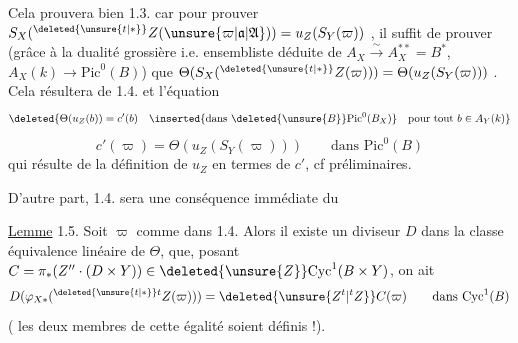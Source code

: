 Cela prouvera bien 1.3. car pour prouver $S_X({}^{\deleted{\unsure{t|*}}}Z(\unsure{\varpi|\mathfrak{a}|\mathfrak{A}}))=u_Z(S_Y(\varpi))$ , il suffit de prouver (grâce à la dualité grossière i.e. ensembliste  déduite de $A_X\xrightarrow{\sim}A_X^{**}=B^*$,  $A_X(k)\longrightarrow\mathrm{Pic}^0(B)$) que $\Theta(S_X({}^{\deleted{\unsure{t|*}}}Z(\varpi)))=\Theta(u_Z(S_Y(\varpi)))$ .  Cela résultera de 1.4. et  l'équation
\[
\deleted{\Theta(u_Z(b))=c'(b)\quad\inserted{\text{dans }\deleted{\unsure{B}}\mathrm{Pic}^0(B_X)}\quad\text{pour tout } b\in A_Y(k)}
\]
\[
c'(\varpi)=\Theta(u_Z(S_Y(\varpi)))\qquad\text{dans }\mathrm{Pic}^0(B)
\]
qui résulte de la définition de $u_Z$ en termes de $c'$, cf préliminaires.

D'autre part, 1.4. sera une conséquence immédiate du

\uline{Lemme} 1.5. Soit $\varpi$ comme dans 1.4. Alors il existe un diviseur $D$ dans la classe équivalence linéaire de $\Theta$,  que,  posant $C=\pi_*(Z''\cdot(D\times Y))\in\deleted{\unsure{Z}}\mathrm{Cyc}^1(B\times Y)$,  on ait
\[
D(\varphi_{X*}({}^{\deleted{\unsure{t|*}}t}Z(\varpi)))=\deleted{\unsure{Z^t|{}^t Z}}C(\varpi)\qquad\text{dans }\mathrm{Cyc}^1(B)
\]
( les deux membres de cette égalité soient définis !).
